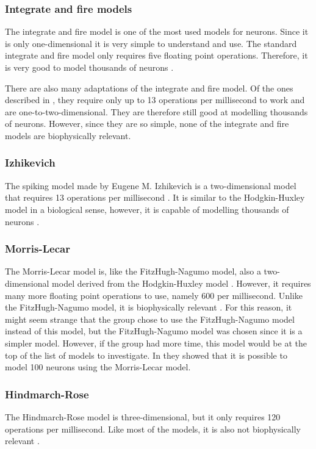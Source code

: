 \documentclass[class={myRUCProject}, crop=false]{standalone}
\begin{document}
\subsubsection*{Integrate and fire models}
The integrate and fire model is one of the most used models for neurons. Since it is only one-dimensional it is very simple to understand and use. The standard integrate and fire model only requires five floating point operations. Therefore, it is very good to model thousands of neurons \cite{Izhikevich2004}.

There are also many adaptations of the integrate and fire model. Of the ones described in \cite{Izhikevich2004}, they require only up to 13 operations per millisecond to work and are one-to-two-dimensional. They are therefore still good at modelling thousands of neurons. However, since they are so simple, none of the integrate and fire models are biophysically relevant.

\subsubsection*{Izhikevich}
The spiking model made by Eugene M. Izhikevich is a two-dimensional model that requires 13 operations per millisecond \cite{Izhikevich2004}. It is similar to the Hodgkin-Huxley model in a biological sense, however, it is capable of modelling thousands of neurons \cite{Muni2022}. 

\subsubsection*{Morris-Lecar}
The Morris-Lecar model is, like the FitzHugh-Nagumo model, also a two-dimensional model derived from the Hodgkin-Huxley model \cite{Baladron2012}. However, it requires many more floating point operations to use, namely 600 per millisecond. Unlike the FitzHugh-Nagumo model, it is biophysically relevant \cite{Izhikevich2004}. For this reason, it might seem strange that the group chose to use the FitzHugh-Nagumo model instead of this model, but the FitzHugh-Nagumo model was chosen since it is a simpler model. However, if the group had more time, this model would be at the top of the list of models to investigate. In \cite{kasatkin2015transient} they showed that it is possible to model 100 neurons using the Morris-Lecar model.


\subsubsection*{Hindmarch-Rose}
The Hindmarch-Rose model is three-dimensional, but it only requires 120 operations per millisecond. Like most of the models, it is also not biophysically relevant \cite{Izhikevich2004}.
\end{document}
